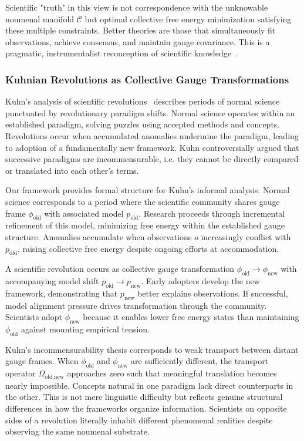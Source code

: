 \documentclass[11pt]{article}
\begin{document}
Scientific "truth" in this view is not correspondence with the unknowable noumenal manifold $\mathcal{C}$ but optimal collective free energy minimization satisfying these multiple constraints. Better theories are those that simultaneously fit observations, achieve consensus, and maintain gauge covariance. This is a pragmatic, instrumentalist reconception of scientific knowledge~\cite{vanFraassen1980,Laudan1984}.

\subsubsection{Kuhnian Revolutions as Collective Gauge Transformations}

Kuhn's analysis of scientific revolutions~\cite{Kuhn1962} describes periods of normal science punctuated by revolutionary paradigm shifts. Normal science operates within an established paradigm, solving puzzles using accepted methods and concepts. Revolutions occur when accumulated anomalies undermine the paradigm, leading to adoption of a fundamentally new framework. Kuhn controversially argued that successive paradigms are incommensurable, i.e. they cannot be directly compared or translated into each other's terms.

Our framework provides formal structure for Kuhn's informal analysis. Normal science corresponds to a period where the scientific community shares gauge frame $\phi_{\text{old}}$ with associated model $p_{\text{old}}$. Research proceeds through incremental refinement of this model, minimizing free energy within the established gauge structure. Anomalies accumulate when observations $o$ increasingly conflict with $p_{\text{old}}$, raising collective free energy despite ongoing efforts at accommodation.

A scientific revolution occurs as collective gauge transformation $\phi_{\text{old}} \to \phi_{\text{new}}$ with accompanying model shift $p_{\text{old}} \to p_{\text{new}}$. Early adopters develop the new framework, demonstrating that $p_{\text{new}}$ better explains observations. If successful, model alignment pressure drives transformation through the community. Scientists adopt $\phi_{\text{new}}$ because it enables lower free energy states than maintaining $\phi_{\text{old}}$ against mounting empirical tension.

Kuhn's incommensurability thesis corresponds to weak transport between distant gauge frames. When $\phi_{\text{old}}$ and $\phi_{\text{new}}$ are sufficiently different, the transport operator $\Omega_{\text{old,new}}$ approaches zero such that meaningful translation becomes nearly impossible. Concepts natural in one paradigm lack direct counterparts in the other. This is not mere linguistic difficulty but reflects genuine structural differences in how the frameworks organize information. Scientists on opposite sides of a revolution literally inhabit different phenomenal realities despite observing the same noumenal substrate.
\end{document}
